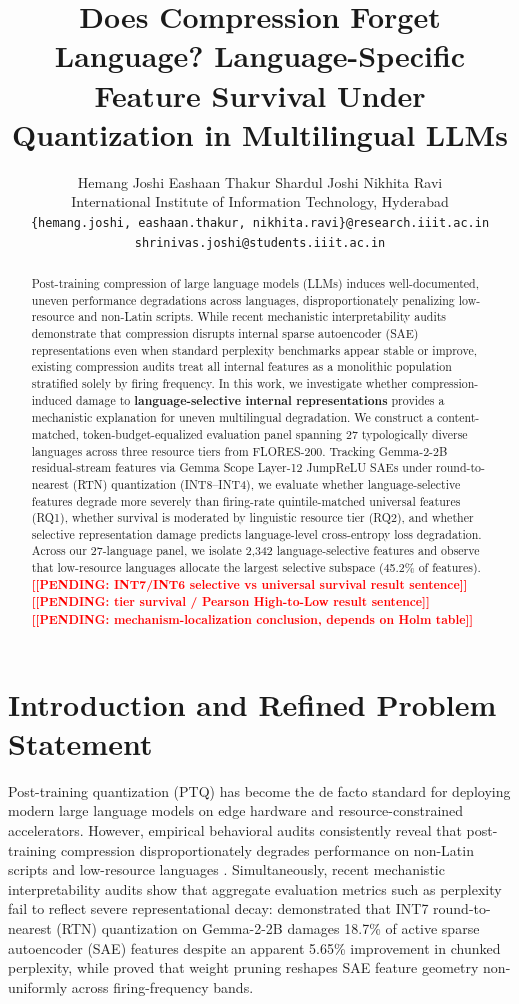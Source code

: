 \documentclass[11pt]{article}
\title{Does Compression Forget Language? Language-Specific Feature Survival Under Quantization in Multilingual LLMs}
\author{
  Hemang Joshi \quad Eashaan Thakur \quad Shardul Joshi \quad Nikhita Ravi \\
  International Institute of Information Technology, Hyderabad \\
  \texttt{\{hemang.joshi, eashaan.thakur, nikhita.ravi\}@research.iiit.ac.in} \\
  \texttt{shrinivas.joshi@students.iiit.ac.in}
}
\newcommand{\TODO}[1]{\textbf{\textcolor{red}{[[#1]]}}}
\begin{document}
\maketitle

\begin{abstract}
Post-training compression of large language models (LLMs) induces well-documented, uneven performance degradations across languages, disproportionately penalizing low-resource and non-Latin scripts. While recent mechanistic interpretability audits demonstrate that compression disrupts internal sparse autoencoder (SAE) representations even when standard perplexity benchmarks appear stable or improve, existing compression audits treat all internal features as a monolithic population stratified solely by firing frequency. In this work, we investigate whether compression-induced damage to \textbf{language-selective internal representations} provides a mechanistic explanation for uneven multilingual degradation. We construct a content-matched, token-budget-equalized evaluation panel spanning 27 typologically diverse languages across three resource tiers from FLORES-200. Tracking Gemma-2-2B residual-stream features via Gemma Scope Layer-12 JumpReLU SAEs under round-to-nearest (RTN) quantization (INT8--INT4), we evaluate whether language-selective features degrade more severely than firing-rate quintile-matched universal features (RQ1), whether survival is moderated by linguistic resource tier (RQ2), and whether selective representation damage predicts language-level cross-entropy loss degradation. Across our 27-language panel, we isolate 2,342 language-selective features and observe that low-resource languages allocate the largest selective subspace (45.2\% of features). \TODO{PENDING: INT7/INT6 selective vs universal survival result sentence} \TODO{PENDING: tier survival / Pearson High-to-Low result sentence} \TODO{PENDING: mechanism-localization conclusion, depends on Holm table}
\end{abstract}

\section{Introduction and Refined Problem Statement}
Post-training quantization (PTQ) has become the de facto standard for deploying modern large language models on edge hardware and resource-constrained accelerators. However, empirical behavioral audits consistently reveal that post-training compression disproportionately degrades performance on non-Latin scripts and low-resource languages \citep{marchisio2024quantization, marie2025uneven, soualhi2026multilingual}. Simultaneously, recent mechanistic interpretability audits show that aggregate evaluation metrics such as perplexity fail to reflect severe representational decay: \citet{duan2026perplexity} demonstrated that INT7 round-to-nearest (RTN) quantization on Gemma-2-2B damages 18.7\% of active sparse autoencoder (SAE) features despite an apparent 5.65\% improvement in chunked perplexity, while \citet{borobia2026how} proved that weight pruning reshapes SAE feature geometry non-uniformly across firing-frequency bands.
\end{document}
